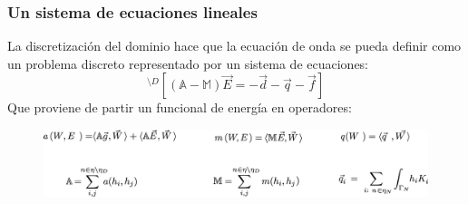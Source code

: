 \documentclass[xcolor=table,serif]{beamer}
\begin{document}
	\begin{frame}
	\frametitle{Un sistema de ecuaciones lineales}
	
	La discretización del dominio hace que la ecuación de onda se pueda definir como un problema discreto representado por un sistema de ecuaciones:
	\begin{equation*}
^{\setminus D}\left[\left(\mathbb{A}-\mathbb{M}\right)\vec{E}= -\vec{d}-\vec{q}-\vec{f}\right]
\end{equation*}
	\pause
	Que proviene de partir un funcional de energía en operadores:
	\begin{figure}
	\includegraphics[scale=0.18]{matrices_3.eps}
	\end{figure}		
	
	
%	
	\end{frame}	
\end{document}
